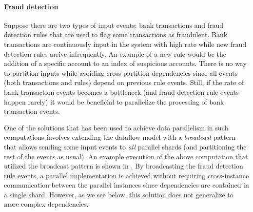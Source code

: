 \paragraph{Fraud detection}
Suppose there are two types of input events: bank transactions and fraud detection rules
that are used to flag some transactions as fraudulent. Bank
transactions are continuously input in the system with high rate while new
fraud detection rules arrive infrequently. An example of a new rule would
be the addition of a specific account to an index of suspicious accounts.
There is no way to partition inputs while
avoiding cross-partition dependencies since all events (both
transactions and rules) depend on previous rule events. Still, if the
rate of bank transaction events becomes a bottleneck (and fraud
detection rule events happen rarely) it would be beneficial to
parallelize the processing of bank transaction events.

One of the solutions that has been used to achieve data parallelism in
such computations involves extending the dataflow model with a
\emph{broadcast} pattern that allows sending some input events to \emph{all}
parallel shards (and partitioning the rest of the events as usual). An
example execution of the above computation that utilized the broadcast
pattern is shown in . By
broadcasting the fraud detection rule events, a parallel implementation
is achieved without requiring cross-instance communication between the
parallel instances since dependencies are contained in a single
shard. However, as we see below, this solution does not generalize to
more complex dependencies.

